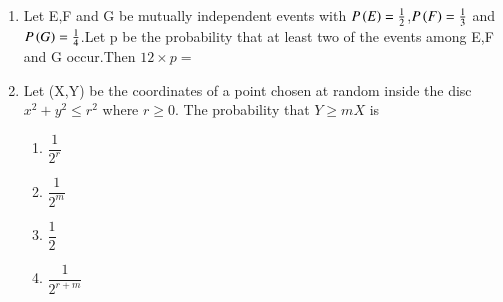 \documentclass[journal,12pt,twocolumn]{IEEEtran}
\begin{document}
\begin{enumerate}
\begin{enumerate}
    \item {}\\
    \item {}\\
\end{enumerate}   
%
\solution
  
%
\item Let E,F and G be mutually independent events with $P\left(E\right)=\frac{1}{2}$,$P\left(F\right)=\frac{1}{3}$ and $P\left(G\right)=\frac{1}{4}$.Let p be the probability that at least two of the events among E,F and G occur.Then $12\times p=$
%
\solution
  
%
\item Let (X,Y) be the coordinates of a point chosen at random inside the disc $x^2 + y^2 \leq r^2$ where $r\geq 0$. The probability that $Y \geq mX$ is
\begin{enumerate}[label = (\alph*)]
\setlength\itemsep{2em}
    \item $\dfrac{1}{2^r}$
    \item $\dfrac{1}{2^m}$
    \item $\dfrac{1}{2}$
    \item $\dfrac{1}{2^{r+m}}$
\end{enumerate}
%
\solution
  
%
	
\end{enumerate}
\end{document}

